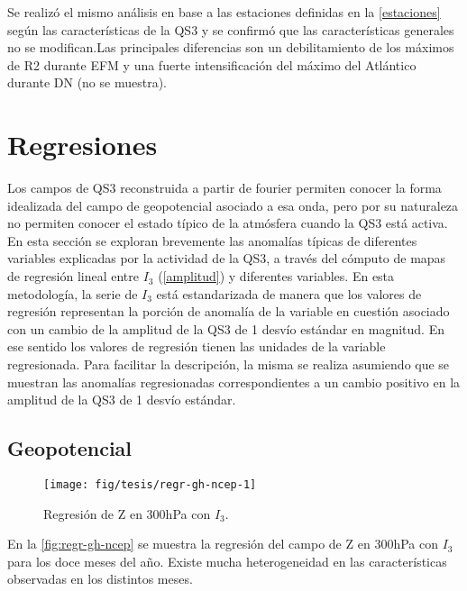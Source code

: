 \documentclass[spanish,a4paper,12pt]{book}
\begin{document}
Se realizó el mismo análisis en base a las estaciones definidas en la
\autoref{estaciones} según las características de la QS3 y se confirmó
que las características generales no se modifican.Las principales
diferencias son un debilitamiento de los máximos de R2 durante EFM y una
fuerte intensificación del máximo del Atlántico durante DN (no se
muestra).

\section{Regresiones}\label{regresiones}

Los campos de QS3 reconstruida a partir de fourier permiten conocer la
forma idealizada del campo de geopotencial asociado a esa onda, pero por
su naturaleza no permiten conocer el estado típico de la atmósfera
cuando la QS3 está activa. En esta sección se exploran brevemente las
anomalías típicas de diferentes variables explicadas por la actividad de
la QS3, a través del cómputo de mapas de regresión lineal entre \(I_3\)
(\autoref{amplitud}) y diferentes variables. En esta metodología, la
serie de \(I_3\) está estandarizada de manera que los valores de
regresión representan la porción de anomalía de la variable en cuestión
asociado con un cambio de la amplitud de la QS3 de 1 desvío estándar en
magnitud. En ese sentido los valores de regresión tienen las unidades de
la variable regresionada. Para facilitar la descripción, la misma se
realiza asumiendo que se muestran las anomalías regresionadas
correspondientes a un cambio positivo en la amplitud de la QS3 de 1
desvío estándar.

\subsection{Geopotencial}\label{geopotencial}

\begin{landscape}\begin{figure}

{\centering \texttt{[image: fig/tesis/regr-gh-ncep-1]} 

}

\caption{Regresión de Z en 300hPa con $I_3$.}\label{fig:regr-gh-ncep}
\end{figure}
\end{landscape}

En la \autoref{fig:regr-gh-ncep} se muestra la regresión del campo de Z
en 300hPa con \(I_3\) para los doce meses del año. Existe mucha
heterogeneidad en las características observadas en los distintos meses.
\end{document}
